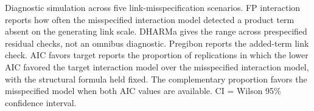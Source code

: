 \documentclass[
  man,
  longtable,
  nolmodern,
  notxfonts,
  notimes,
  colorlinks=true,linkcolor=blue,citecolor=blue,urlcolor=blue]{apa7}
\begin{document}
\begin{table}

{\caption{{Diagnostic simulation across five link-misspecification
scenarios. FP interaction reports how often the misspecified interaction
model detected a product term absent on the generating link scale.
DHARMa gives the range across prespecified residual checks, not an
omnibus diagnostic. Pregibon reports the added-term link check. AIC
favors target reports the proportion of replications in which the lower
AIC favored the target interaction model over the misspecified
interaction model, with the structural formula held fixed. The
complementary proportion favors the misspecified model when both AIC
values are available. CI = Wilson 95\% confidence
interval.}{\label{tbl-diagnostic-scenarios}}}
\vspace{-20pt}}


\end{table}
\end{document}
